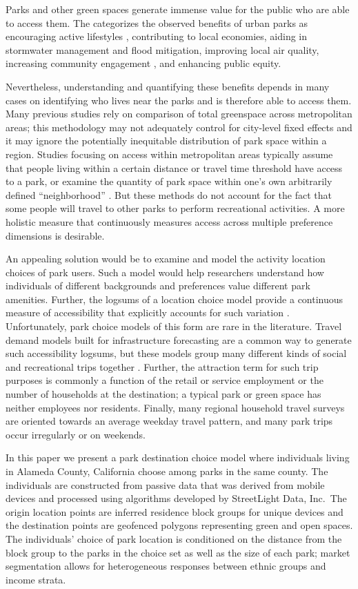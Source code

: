 \documentclass[3p, authoryear]{elsarticle} %
\begin{document}
Parks and other green spaces generate immense value for the public who are able
to access them. The \citet{CityParksAlliance} categorizes the observed benefits of
urban parks as encouraging active lifestyles \citep{Bancroft2015}, contributing to
local economies, aiding in stormwater management and flood mitigation,
improving local air quality, increasing community engagement \citep{Madzia2018}, and
enhancing public equity.

Nevertheless, understanding and quantifying these benefits depends in many
cases on identifying who lives near the parks and is therefore able to access
them. Many previous studies \citep[e.g.,][]{Richardson2012} rely on comparison of total
greenspace across metropolitan areas; this methodology may not adequately
control for city-level fixed effects and it may ignore the potentially
inequitable distribution of park space within a region. Studies focusing on
access within metropolitan areas typically assume that people living within a
certain distance or travel time threshold have access to a park, or examine the
quantity of park space within one's own arbitrarily defined ``neighborhood''
\citep[Stark2014]{Mitchell2008}. But these methods do not account for the fact that
some people will travel to other parks to perform recreational activities. A
more holistic measure that continuously measures access across multiple
preference dimensions is desirable.

An appealing solution would be to examine and model the activity location
choices of park users. Such a model would help researchers understand how
individuals of different backgrounds and preferences value different park
amenities. Further, the logsums of a location choice model provide a continuous
measure of accessibility that explicitly accounts for such variation
\citep{DeJong2007}. Unfortunately, park choice models of this form are rare in the
literature. Travel demand models built for infrastructure forecasting are a
common way to generate such accessibility logsums, but these models group many
different kinds of social and recreational trips together \citep{nchrp716}. Further,
the attraction term for such trip purposes is commonly a function of the retail
or service employment or the number of households at the destination; a typical
park or green space has neither employees nor residents. Finally, many regional
household travel surveys are oriented towards an average weekday travel
pattern, and many park trips occur irregularly or on weekends.

In this paper we present a park destination choice model where individuals
living in Alameda County, California choose among parks in the same county. The
individuals are constructed from passive data that was derived from mobile
devices and processed using algorithms developed by StreetLight Data, Inc.~The
origin location points are inferred residence block groups for unique devices
and the destination points are geofenced polygons representing green and open
spaces. The individuals' choice of park location is conditioned on the distance
from the block group to the parks in the choice set as well as the size of each
park; market segmentation allows for heterogeneous responses between ethnic
groups and income strata.
\end{document}
